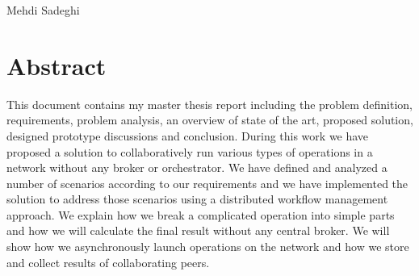 \documentclass[12pt, a4paper, oneside]{report}
\newcounter{chapter_count}
\begin{document}
Mehdi Sadeghi

\chapter*{Abstract}
This document contains my master thesis report including the problem definition, requirements, problem analysis,
an overview of state of the art, proposed solution, designed prototype discussions and conclusion.
During this work we have proposed a solution to collaboratively run various types of operations in a network without any broker or orchestrator. 
We have defined and analyzed a number of scenarios according to our requirements 
and we have implemented the solution to address those scenarios using a distributed workflow management approach. We explain how
we break a complicated operation into simple parts and how we will calculate the final result without any central broker. We will show how
we asynchronously launch operations on the network and how we store and collect results of collaborating peers.


\tableofcontents
\newpage





\printbibliography[heading=bibintoc, title={References}]
\end{document}
